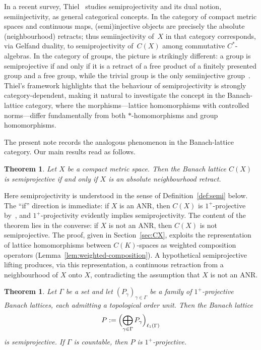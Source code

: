 \documentclass[11pt]{amsart}
\numberwithin{equation}{section}
\theoremstyle{definition}
\theoremstyle{remark}
\theoremstyle{plain}
\newcounter{maintheorem}
\newtheorem{mainth}[maintheorem]{Theorem}
\begin{document}
In a recent survey, Thiel~\cite{thiel-categories} studies semiprojectivity and its
dual notion, semiinjectivity, as general categorical concepts.
In the category of compact metric spaces and continuous maps,
(semi)injective objects are precisely the absolute (neighbourhood) retracts;
thus semiinjectivity of~$X$ in that category corresponds, via Gelfand duality,
to semiprojectivity of~$C(X)$ among commutative $C^*$-algebras.
In the category of groups, the picture is strikingly different:
a group is semiprojective if and only if it is a retract of a free product
of a finitely presented group and a free group, while the trivial group is
the only semiinjective group~\cite[Propositions~3.7 and~3.9]{thiel-categories}.
Thiel's framework highlights that the behaviour of semiprojectivity is
strongly category-dependent, making it natural to investigate the concept in the
Banach-lattice category, where the morphisms---lattice homomorphisms with
controlled norms---differ fundamentally from both $*$-homomorphisms and group
homomorphisms.

The present note records the analogous phenomenon in the Banach-lattice category.
Our main results read as follows.

\begin{mainth}\label{thm:A}
Let $X$ be a compact metric space.
Then the Banach lattice $C(X)$ is semiprojective
if and only if $X$ is an absolute neighbourhood retract.
\end{mainth}

Here semiprojectivity is understood in the sense of Definition~\ref{def:semi} below.
The ``if'' direction is immediate: if $X$ is an ANR, then $C(X)$ is $1^+$-projective
by~\cite[Theorem~1.4]{avilaes2020}, and $1^+$-projectivity evidently implies semiprojectivity.
The content of the theorem lies in the converse:
if $X$ is not an ANR, then $C(X)$ is not semiprojective.
The proof, given in Section~\ref{sec:CX}, exploits the representation of lattice
homomorphisms between $C(K)$-spaces as weighted composition operators
(Lemma~\ref{lem:weighted-composition}).
A hypothetical semiprojective lifting produces, via this representation,
a continuous retraction from a neighbourhood of $X$ onto $X$,
contradicting the assumption that $X$ is not an ANR.

\begin{mainth}\label{thm:B}
Let\/ $\Gamma$ be a set and let\/ $(P_\gamma)_{\gamma\in\Gamma}$ be a family of
$1^+$-projective Banach lattices, each admitting a topological order unit.
Then the Banach lattice
\[
P:=\Bigl(\bigoplus_{\gamma\in\Gamma} P_\gamma\Bigr)_{\ell_1(\Gamma)}
\]
is semiprojective. If\/ $\Gamma$ is countable, then $P$ is $1^+$-projective.
\end{mainth}
\end{document}
